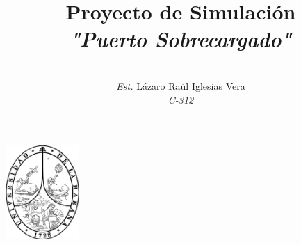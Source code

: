 \documentclass[a4paper,10pt]{article}
\begin{document}
	
	
	\begin{center}
		\includegraphics[width = 1.1in]{./images/escudo.png} 
	\end{center}
	
	
	\title{Proyecto de Simulaci\'on\\ \emph{ "Puerto Sobrecargado" }}
	
	\vspace{4mm}
	
	\author{\\
		\name \emph{Est.} L\'azaro Ra\'ul Iglesias Vera \vspace{2mm}  \\
		\emph{C-312}    
	}
	\vspace{4mm}
	\maketitle
	
	
	
	
	\ShortHeadings{}{}
	
	
	
	
\end{document}
